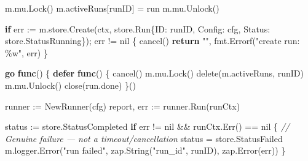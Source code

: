 \documentclass[
]{article}
\newenvironment{Shaded}{}{}
\newcommand{\BuiltInTok}[1]{\textcolor[rgb]{0.00,0.50,0.00}{#1}}
\newcommand{\CommentTok}[1]{\textcolor[rgb]{0.38,0.63,0.69}{\textit{#1}}}
\newcommand{\ControlFlowTok}[1]{\textcolor[rgb]{0.00,0.44,0.13}{\textbf{#1}}}
\newcommand{\KeywordTok}[1]{\textcolor[rgb]{0.00,0.44,0.13}{\textbf{#1}}}
\newcommand{\NormalTok}[1]{#1}
\newcommand{\OperatorTok}[1]{\textcolor[rgb]{0.40,0.40,0.40}{#1}}
\newcommand{\OtherTok}[1]{\textcolor[rgb]{0.00,0.44,0.13}{#1}}
\newcommand{\StringTok}[1]{\textcolor[rgb]{0.25,0.44,0.63}{#1}}
\begin{document}
\begin{Shaded}
\begin{Highlighting}[]
\NormalTok{    m}\OperatorTok{.}\NormalTok{mu}\OperatorTok{.}\NormalTok{Lock}\OperatorTok{()}
\NormalTok{    m}\OperatorTok{.}\NormalTok{activeRuns}\OperatorTok{[}\NormalTok{runID}\OperatorTok{]} \OperatorTok{=}\NormalTok{ run}
\NormalTok{    m}\OperatorTok{.}\NormalTok{mu}\OperatorTok{.}\NormalTok{Unlock}\OperatorTok{()}

    \ControlFlowTok{if}\NormalTok{ err }\OperatorTok{:=}\NormalTok{ m}\OperatorTok{.}\NormalTok{store}\OperatorTok{.}\NormalTok{Create}\OperatorTok{(}\NormalTok{ctx}\OperatorTok{,}\NormalTok{ store}\OperatorTok{.}\NormalTok{Run}\OperatorTok{\{}\NormalTok{ID}\OperatorTok{:}\NormalTok{ runID}\OperatorTok{,}\NormalTok{ Config}\OperatorTok{:}\NormalTok{ cfg}\OperatorTok{,}\NormalTok{ Status}\OperatorTok{:}\NormalTok{ store}\OperatorTok{.}\NormalTok{StatusRunning}\OperatorTok{\});}\NormalTok{ err }\OperatorTok{!=} \OtherTok{nil} \OperatorTok{\{}
\NormalTok{        cancel}\OperatorTok{()}
        \ControlFlowTok{return} \StringTok{""}\OperatorTok{,}\NormalTok{ fmt}\OperatorTok{.}\NormalTok{Errorf}\OperatorTok{(}\StringTok{"create run: \%w"}\OperatorTok{,}\NormalTok{ err}\OperatorTok{)}
    \OperatorTok{\}}

    \ControlFlowTok{go} \KeywordTok{func}\OperatorTok{()} \OperatorTok{\{}
        \ControlFlowTok{defer} \KeywordTok{func}\OperatorTok{()} \OperatorTok{\{}
\NormalTok{            cancel}\OperatorTok{()}
\NormalTok{            m}\OperatorTok{.}\NormalTok{mu}\OperatorTok{.}\NormalTok{Lock}\OperatorTok{()}
            \BuiltInTok{delete}\OperatorTok{(}\NormalTok{m}\OperatorTok{.}\NormalTok{activeRuns}\OperatorTok{,}\NormalTok{ runID}\OperatorTok{)}
\NormalTok{            m}\OperatorTok{.}\NormalTok{mu}\OperatorTok{.}\NormalTok{Unlock}\OperatorTok{()}
            \BuiltInTok{close}\OperatorTok{(}\NormalTok{run}\OperatorTok{.}\NormalTok{done}\OperatorTok{)}
        \OperatorTok{\}()}

\NormalTok{        runner }\OperatorTok{:=}\NormalTok{ NewRunner}\OperatorTok{(}\NormalTok{cfg}\OperatorTok{)}
\NormalTok{        report}\OperatorTok{,}\NormalTok{ err }\OperatorTok{:=}\NormalTok{ runner}\OperatorTok{.}\NormalTok{Run}\OperatorTok{(}\NormalTok{runCtx}\OperatorTok{)}

\NormalTok{        status }\OperatorTok{:=}\NormalTok{ store}\OperatorTok{.}\NormalTok{StatusCompleted}
        \ControlFlowTok{if}\NormalTok{ err }\OperatorTok{!=} \OtherTok{nil} \OperatorTok{\&\&}\NormalTok{ runCtx}\OperatorTok{.}\NormalTok{Err}\OperatorTok{()} \OperatorTok{==} \OtherTok{nil} \OperatorTok{\{}
            \CommentTok{// Genuine failure — not a timeout/cancellation}
\NormalTok{            status }\OperatorTok{=}\NormalTok{ store}\OperatorTok{.}\NormalTok{StatusFailed}
\NormalTok{            m}\OperatorTok{.}\NormalTok{logger}\OperatorTok{.}\NormalTok{Error}\OperatorTok{(}\StringTok{"run failed"}\OperatorTok{,}\NormalTok{ zap}\OperatorTok{.}\NormalTok{String}\OperatorTok{(}\StringTok{"run\_id"}\OperatorTok{,}\NormalTok{ runID}\OperatorTok{),}\NormalTok{ zap}\OperatorTok{.}\NormalTok{Error}\OperatorTok{(}\NormalTok{err}\OperatorTok{))}
        \OperatorTok{\}}


\end{Highlighting}
\end{Shaded}
\end{document}
